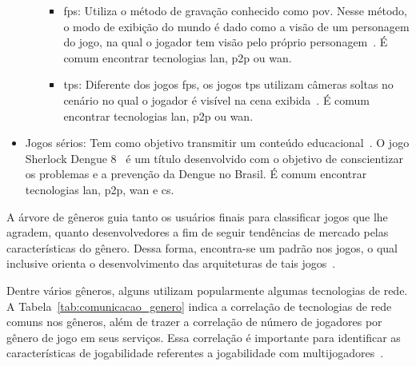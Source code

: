 \begin{itemize}
\begin{itemize}
\begin{itemize}
          \item \ac{fps}: Utiliza o método de gravação conhecido como \ac{pov}. Nesse método, o modo de exibição do mundo é dado como a visão de um personagem do jogo, na qual o jogador tem visão pelo próprio personagem~\cite{video_game_technologies, adams_1208533}. É comum encontrar tecnologias \ac{lan}, \ac{p2p} ou \ac{wan}.
          \item \ac{tps}: Diferente dos jogos \ac{fps}, os jogos \ac{tps} utilizam câmeras soltas no cenário no qual o jogador é visível na cena exibida~\cite{video_game_technologies, adams_1208533}. É comum encontrar tecnologias \ac{lan}, \ac{p2p} ou \ac{wan}.
        \end{itemize}
    \end{itemize}
  \item Jogos sérios: Tem como objetivo transmitir um conteúdo educacional~\cite{video_game_technologies}. O jogo Sherlock Dengue 8~\cite{sherlock_dengue} é um título desenvolvido com o objetivo de conscientizar os problemas e a prevenção da Dengue no Brasil. É comum encontrar tecnologias \ac{lan}, \ac{p2p}, \ac{wan} e \ac{cs}.
\end{itemize}

A árvore de gêneros guia tanto os usuários finais para classificar jogos que lhe agradem, quanto desenvolvedores a fim de seguir tendências de mercado pelas características do gênero.
%
Dessa forma, encontra-se um padrão nos jogos, o qual inclusive orienta o desenvolvimento das arquiteturas de tais jogos~\cite{video_game_technologies}.

Dentre vários gêneros, alguns utilizam popularmente algumas tecnologias de rede.
%
A Tabela~\ref{tab:comunicacao_genero} indica a correlação de tecnologias de rede comuns nos gêneros, além de trazer a correlação de número de jogadores por gênero de jogo em seus serviços.
%
Essa correlação é importante para identificar as características de jogabilidade referentes a jogabilidade com multijogadores~\cite{video_game_technologies}.


